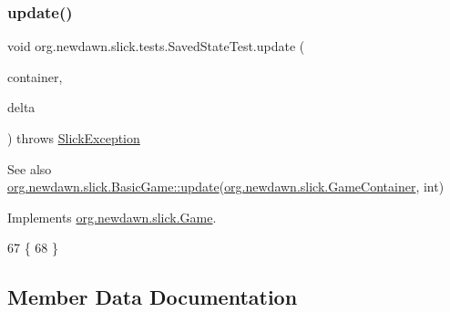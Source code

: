 \mbox{\label{classorg_1_1newdawn_1_1slick_1_1tests_1_1_saved_state_test_a8579e572ac2db1c292660cdd79f26887}} 
\subsubsection{\texorpdfstring{update()}{update()}}
{\footnotesize\ttfamily void org.\+newdawn.\+slick.\+tests.\+Saved\+State\+Test.\+update (\begin{DoxyParamCaption}\item[{\mbox{\hyperlink{classorg_1_1newdawn_1_1slick_1_1_game_container}{Game\+Container}}}]{container,  }\item[{int}]{delta }\end{DoxyParamCaption}) throws \mbox{\hyperlink{classorg_1_1newdawn_1_1slick_1_1_slick_exception}{Slick\+Exception}}\hspace{0.3cm}{\ttfamily [inline]}}

\begin{DoxySeeAlso}{See also}
\mbox{\hyperlink{classorg_1_1newdawn_1_1slick_1_1_basic_game_acfe6fa05aef83bff1631af91a3e4bd20}{org.\+newdawn.\+slick.\+Basic\+Game\+::update}}(\mbox{\hyperlink{classorg_1_1newdawn_1_1slick_1_1_game_container}{org.\+newdawn.\+slick.\+Game\+Container}}, int) 
\end{DoxySeeAlso}


Implements \mbox{\hyperlink{interfaceorg_1_1newdawn_1_1slick_1_1_game_ab07b2e9463ee4631620dde0de25bdee8}{org.\+newdawn.\+slick.\+Game}}.


\begin{DoxyCode}
67                                                                                  \{
68     \}
\end{DoxyCode}


\subsection{Member Data Documentation}
\mbox{\label{classorg_1_1newdawn_1_1slick_1_1tests_1_1_saved_state_test_afe659155529ab918d03931356abaeaa5}} 
